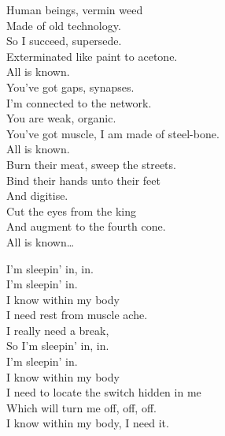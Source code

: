 



Human beings, vermin weed \\
Made of old technology. \\
So I succeed, supersede. \\
Exterminated like paint to acetone. \\

All is known. \\

You've got gaps, synapses. \\
I'm connected to the network. \\
You are weak, organic. \\
You've got muscle, I am made of steel-bone. \\

All is known. \\

Burn their meat, sweep the streets. \\
Bind their hands unto their feet \\
And digitise. \\
Cut the eyes from the king \\
And augment to the fourth cone. \\

All is known… \\





I'm sleepin' in, in. \\
I'm sleepin' in. \\

I know within my body \\
I need rest from muscle ache. \\
I really need a break, \\
So I'm sleepin' in, in. \\
I'm sleepin' in. \\

I know within my body \\
I need to locate the switch hidden in me \\
Which will turn me off, off, off. \\
I know within my body, I need it. \\

